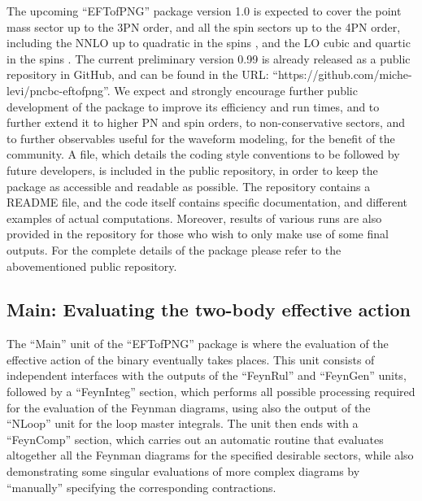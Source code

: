 \documentclass[a4paper,11pt]{article}
\begin{document}
The upcoming ``EFTofPNG'' package version 1.0 is expected to cover the point mass sector up 
to the 3PN order, and all the spin sectors up to the 4PN order, including the NNLO up to 
quadratic in the spins \cite{Levi:2011eq,Levi:2015uxa,Levi:2015ixa}, and the LO cubic and 
quartic in the spins \cite{Levi:2014gsa}. The current preliminary version 0.99 is already 
released as a public repository in GitHub, and can be found in the URL: 
``https://github.com/miche-levi/pncbc-eftofpng''. 
We expect and strongly encourage further public development of the package to improve its 
efficiency and run times, and to further extend it to higher PN and spin orders, to 
non-conservative sectors, and to further observables useful for the waveform modeling, for 
the benefit of the community. A file, which details the coding style conventions to be 
followed by future developers, is included in the public repository, in order to keep the 
package as accessible and readable as possible. 
The repository contains a README file, and the code itself contains specific documentation, 
and different examples of actual computations. 
Moreover, results of various runs are also provided in the repository for those who wish to only make use of some final outputs. 
For the complete details of the package 
please refer to the abovementioned public repository.


\subsection{Main: Evaluating the two-body effective action}
\label{main}

The ``Main'' unit of the ``EFTofPNG'' package is where the evaluation of the effective 
action of the binary eventually takes places. This unit consists of independent interfaces 
with the outputs of the ``FeynRul'' and ``FeynGen'' units, followed by a ``FeynInteg'' 
section, which performs all possible processing required for the evaluation of the Feynman 
diagrams, using also the output of the ``NLoop'' unit for the loop master integrals. The 
unit then ends with a ``FeynComp'' section, which carries out an automatic routine that 
evaluates altogether all the Feynman diagrams for the specified desirable sectors, while 
also demonstrating some singular evaluations of more complex diagrams by ``manually'' 
specifying the corresponding contractions.
\end{document}
